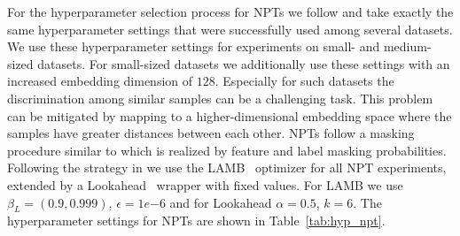 \documentclass{article}
\theoremstyle{plain}
\theoremstyle{definition}
\theoremstyle{remark}
\begin{document}
For the hyperparameter selection process for NPTs we follow \citep{Kossen:21} and take exactly
the same hyperparameter settings that were successfully used among several
datasets. We use these hyperparameter settings for experiments on small- and medium-sized
datasets. For small-sized datasets we additionally use these settings with an increased
embedding dimension of $128$. Especially for such datasets the discrimination among similar samples can be a challenging task. This problem can be mitigated 
by mapping to a higher-dimensional embedding space where the samples have greater
distances between each other.
NPTs follow a masking procedure similar to \citep{Devlin:19}
which is realized by feature and label masking probabilities.
Following the strategy in \citep{Kossen:21} we use the LAMB~\citep{You:20} optimizer for all NPT experiments, extended by a Lookahead~\citep{Zhang1:19} wrapper with fixed values.
For LAMB we use $\beta_L = (0.9, 0.999)$, $\epsilon = 1e{-6}$ and for Lookahead $\alpha = 0.5$, $k = 6$.
The hyperparameter settings for NPTs are shown in Table~\ref{tab:hyp_npt}.
\end{document}
